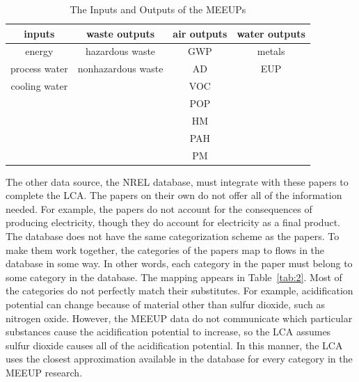 \documentclass[final,journal,10pt,letterpaper,oneside,twocolumn,compsoc]%
{IEEEtran}
\begin{document}
\begin{table}[htbp]
\caption{The Inputs and Outputs of the MEEUPs}
\centering
\begin{tabular}{|c|*{2}{c|}c|}
  \hline
  inputs        & waste outputs       & air outputs & water outputs \\
  \hline
  energy        & hazardous waste     & GWP         & metals \\
  process water & nonhazardous waste & AD          & EUP \\
  cooling water &                     & VOC         &  \\
                &                     & POP         &  \\
                &                     & HM          &  \\
                &                     & PAH         &  \\
                &                     & PM          &  \\
  \hline
\end{tabular}
\label{tab:1}
\end{table}

The other data source, the NREL database, must integrate with these papers to
complete the LCA. The papers on their own do not offer all of the information
needed. For example, the papers do not account for the consequences of producing
electricity, though they do account for electricity as a final product. The
database does not have the same categorization scheme as the papers. To make
them
work together, the categories of the papers map to flows in the database in some
way. In other words, each category in the paper must belong to some category in
the database. The
mapping appears in Table~\ref{tab:2}. Most of the categories do not perfectly
match their substitutes. For example, acidification potential can change because
of
material other than sulfur dioxide, such as nitrogen oxide. However, the MEEUP
data do not communicate which particular substances cause the acidification
potential to increase, so the LCA assumes sulfur dioxide causes all of the
acidification potential. In this manner,
the LCA uses the closest approximation available in the database for every
category in the MEEUP research.
\end{document}

